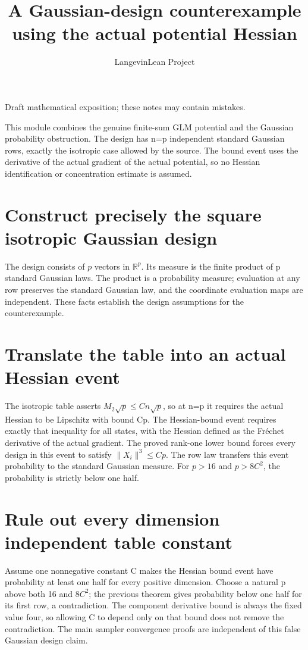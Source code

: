 \documentclass[11pt,a4paper]{article}
\title{\texorpdfstring{A Gaussian-\allowbreak{}design counterexample using the actual potential Hessian}{A Gaussian-design counterexample using the actual potential Hessian}}
\author{LangevinLean Project}
\date{}
\begin{document}
\maketitle
Draft mathematical exposition; these notes may contain mistakes.


This module combines the genuine finite-sum GLM potential and the Gaussian probability obstruction. The design has n=p independent standard Gaussian rows, exactly the isotropic case allowed by the source. The bound event uses the derivative of the actual gradient of the actual potential, so no Hessian identification or concentration estimate is assumed.


\section{\texorpdfstring{Construct precisely the square isotropic Gaussian design}{Construct precisely the square isotropic Gaussian design}}


The design consists of \(p\) vectors in \(\mathbb R^p\). Its measure is the finite product of p standard Gaussian laws. The product is a probability measure; evaluation at any row preserves the standard Gaussian law, and the coordinate evaluation maps are independent. These facts establish the design assumptions for the counterexample.


\section{\texorpdfstring{Translate the table into an actual Hessian event}{Translate the table into an actual Hessian event}}


The isotropic table asserts \(M_2\sqrt p\le Cn\sqrt p\), so at n=p it requires the actual Hessian to be Lipschitz with bound Cp. The Hessian-bound event requires exactly that inequality for all states, with the Hessian defined as the Fréchet derivative of the actual gradient. The proved rank-one lower bound forces every design in this event to satisfy \(\|X_i\|^3\le Cp\). The row law transfers this event probability to the standard Gaussian measure. For \(p>16\) and \(p>8C^2\), the probability is strictly below one half.


\section{\texorpdfstring{Rule out every dimension independent table constant}{Rule out every dimension independent table constant}}


Assume one nonnegative constant C makes the Hessian bound event have probability at least one half for every positive dimension. Choose a natural p above both 16 and \(8C^2\); the previous theorem gives probability below one half for its first row, a contradiction. The component derivative bound is always the fixed value four, so allowing C to depend only on that bound does not remove the contradiction. The main sampler convergence proofs are independent of this false Gaussian design claim.
\end{document}
